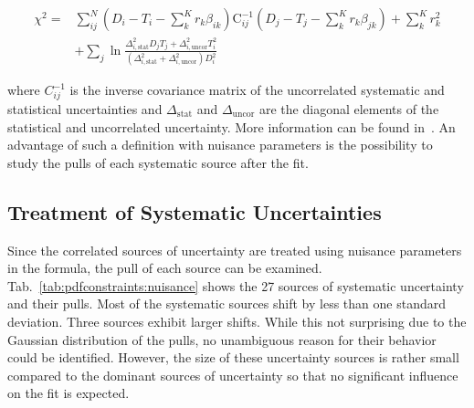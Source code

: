 \begin{align*}
  \chi^2 = &\sum_{ij}^N \left(D_i - T_i - \sum_k^K r_k \beta_{ik}\right) \mathrm{C}_{ij}^{-1}
  \left(D_j - T_j - \sum_k^K r_k \beta_{jk} \right) + \sum_k^K r_k^2\\
  &+ \sum_j \ln \frac{\Delta_{i,\mathrm{stat}}^2 D_j T_j + \Delta_{i,\mathrm{uncor}}^2 T_i^2}{\left( \Delta_{i,\mathrm{stat}}^2 + \Delta_{i,\mathrm{uncor}}^2 \right) D_i^2}
  \label{chi2_nuisance}
\end{align*}

where $C_{ij}^{-1}$ is the inverse covariance matrix of the uncorrelated
systematic and statistical uncertainties and $\Delta_\mathrm{stat}$ and
$\Delta_\mathrm{uncor}$ are the diagonal elements of the statistical and
uncorrelated uncertainty. More information can be found
in~\cite{Alekhin:2014irh,Abramowicz:2015mha}. An advantage of such a \chisq
definition with nuisance parameters is the possibility to study the pulls of
each systematic source after the fit.

\subsection{Treatment of Systematic Uncertainties}
\label{section:cmsdatauncertainties}

%
Since the correlated sources of uncertainty are treated using nuisance
parameters in the \chisq formula, the pull of each source can be examined.
Tab.~\ref{tab:pdfconstraints:nuisance} shows the 27 sources of systematic
uncertainty and their pulls. Most of the systematic sources shift by less than
one standard deviation. Three sources exhibit larger shifts. While this not
surprising due to the Gaussian distribution of the pulls, no unambiguous
reason for their behavior could be identified. However, the size of these
uncertainty sources is rather small compared to the dominant sources of
uncertainty so that no significant influence on the fit is expected.

